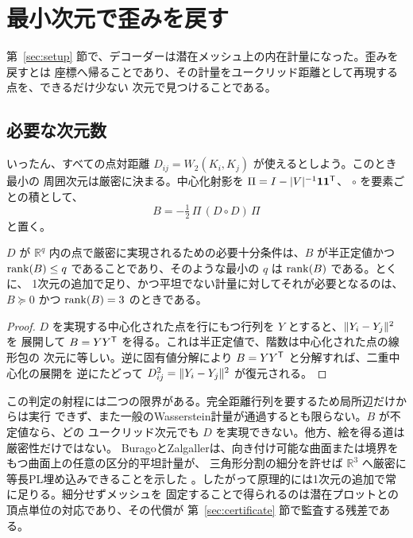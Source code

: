 \section{最小次元で歪みを戻す}
\label{sec:restore}

第~\ref{sec:setup} 節で、デコーダーは潜在メッシュ上の内在計量になった。歪みを戻すとは
座標へ帰ることであり、その計量をユークリッド距離として再現する点を、できるだけ少ない
次元で見つけることである。

\subsection{必要な次元数}
\label{sec:dimension}

いったん、すべての点対距離 $D_{ij}=W_2(K_i,K_j)$ が使えるとしよう。このとき最小の
周囲次元は厳密に決まる。中心化射影を $\Pi=I-|V|^{-1}\mathbf1\mathbf1^{\mathsf{T}}$、
$\circ$ を要素ごとの積として、
\begin{equation}
 B=-\tfrac12\,\Pi\,(D\circ D)\,\Pi
 \label{eq:centered-distance-gram}
\end{equation}
と置く。

\begin{proposition}[最小のユークリッド次元]
\label{prop:dimension-test}
$D$ が $\mathbb R^q$ 内の点で厳密に実現されるための必要十分条件は、$B$ が半正定値かつ
$\operatorname{rank}(B)\le q$ であることであり、そのような最小の $q$ は $\operatorname{rank}(B)$ である。とくに、
1次元の追加で足り、かつ平坦でない計量に対してそれが必要となるのは、$B\succeq0$ かつ
$\operatorname{rank}(B)=3$ のときである。
\end{proposition}

\begin{proof}
$D$ を実現する中心化された点を行にもつ行列を $Y$ とすると、$\lVert Y_i-Y_j\rVert^2$ を
展開して $B=YY^{\mathsf{T}}$ を得る。これは半正定値で、階数は中心化された点の線形包の
次元に等しい。逆に固有値分解により $B=YY^{\mathsf{T}}$ と分解すれば、二重中心化の展開を
逆にたどって $D_{ij}^2=\lVert Y_i-Y_j\rVert^2$ が復元される\cite{liberti2014}。
\end{proof}

この判定の射程には二つの限界がある。完全距離行列を要するため局所辺だけからは実行
できず、また一般のWasserstein計量が通過するとも限らない。$B$ が不定値なら、どの
ユークリッド次元でも $D$ を実現できない。他方、絵を得る道は厳密性だけではない。
BuragoとZalgallerは、向き付け可能な曲面または境界をもつ曲面上の任意の区分的平坦計量が、
三角形分割の細分を許せば $\mathbb R^3$ へ厳密に等長PL埋め込みできることを示した
\cite{burago1995}。したがって原理的には1次元の追加で常に足りる。細分せずメッシュを
固定することで得られるのは潜在プロットとの頂点単位の対応であり、その代償が
第~\ref{sec:certificate} 節で監査する残差である。

